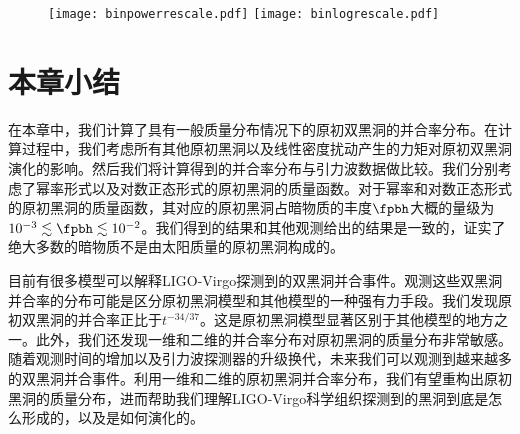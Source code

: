\begin{figure}[htb]
    \centering
    \texttt{[image: binpowerrescale.pdf]}
    \texttt{[image: binlogrescale.pdf]}
\end{figure}

\section{本章小结}
在本章中，我们计算了具有一般质量分布情况下的原初双黑洞的并合率分布。在计算过程中，我们考虑所有其他原初黑洞以及线性密度扰动产生的力矩对原初双黑洞演化的影响。然后我们将计算得到的并合率分布与引力波数据做比较。我们分别考虑了幂率形式以及对数正态形式的原初黑洞的质量函数。对于幂率和对数正态形式的原初黑洞的质量函数，其对应的原初黑洞占暗物质的丰度$\fpbh$大概的量级为$10^{-3} \lesssim \fpbh \lesssim 10^{-2}$。我们得到的结果和其他观测\cite{Chen:2016pud,Green:2016xgy,Schutz:2016khr,Wang:2016ana,Gaggero:2016dpq,Ali-Haimoud:2016mbv,Blum:2016cjs,Horowitz:2016lib,Kuhnel:2017pwq,Inoue:2017csr,Carr:2017jsz,Green:2017qoa,Guo:2017njn,Zumalacarregui:2017qqd,Clesse:2016vqa}给出的结果是一致的，证实了绝大多数的暗物质不是由太阳质量的原初黑洞构成的\cite{Sasaki:2016jop,Ali-Haimoud:2017rtz,Raidal:2017mfl,Kocsis:2017yty}。

目前有很多模型可以解释LIGO-Virgo探测到的双黑洞并合事件。观测这些双黑洞并合率的分布可能是区分原初黑洞模型和其他模型的一种强有力手段。我们发现原初双黑洞的并合率正比于$t^{-34/37}$。这是原初黑洞模型显著区别于其他模型的地方之一。此外，我们还发现一维和二维的并合率分布对原初黑洞的质量分布非常敏感。随着观测时间的增加以及引力波探测器的升级换代，未来我们可以观测到越来越多的双黑洞并合事件。利用一维和二维的原初黑洞并合率分布，我们有望重构出原初黑洞的质量分布，进而帮助我们理解LIGO-Virgo科学组织探测到的黑洞到底是怎么形成的，以及是如何演化的。